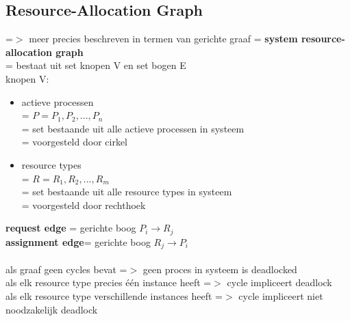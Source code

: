 \documentclass{report}
\begin{document}
\subsection{Resource-Allocation Graph}
=$>$ meer precies beschreven in termen van gerichte graaf = \textbf{system resource-allocation graph}
\\= bestaat uit set knopen V en set bogen E
\\knopen V:
\begin{itemize}
\item actieve processen
\\= $P = {P_{1},P_{2},...,P_{n}}$
\\= set bestaande uit alle actieve processen in systeem
\\= voorgesteld door cirkel
\item resource types
\\= $R = {R_{1},R_{2},...,R_{m}}$
\\= set bestaande uit alle resource types in systeem
\\= voorgesteld door rechthoek

\end{itemize}
\textbf{request edge} = gerichte boog $P_{i} \rightarrow R_{j}$
\\\textbf{assignment edge}= gerichte boog $R_{j} \rightarrow P_{i}$
\\
\\als graaf geen cycles bevat =$>$ geen proces in systeem is deadlocked
\\als elk resource type precies \'e\'en instance heeft =$>$ cycle impliceert deadlock
\\als elk resource type verschillende instances heeft =$>$ cycle impliceert niet noodzakelijk deadlock
\end{document}
